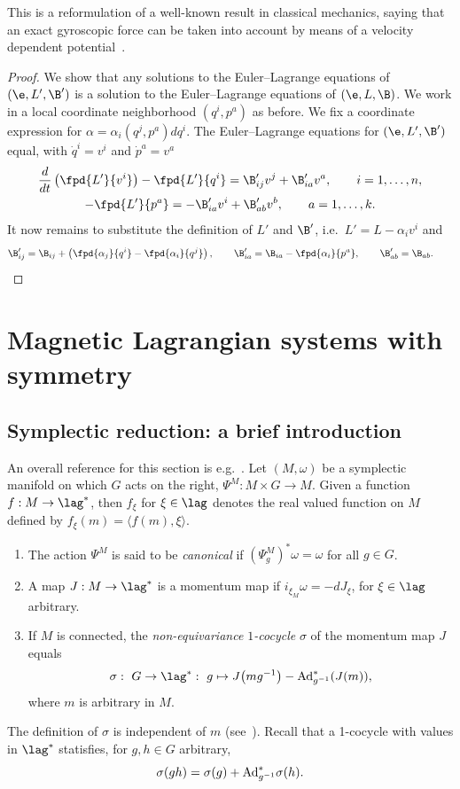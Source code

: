 This is a reformulation of a well-known result in classical mechanics, saying that an exact gyroscopic force can be taken into account by means of a velocity dependent potential~\cite{pars}.
\begin{proof}
We show that any solutions to the Euler--Lagrange equations of $(\e, L',\B ')$ is a solution to the Euler--Lagrange equations of $(\e,L,\B)$. We work in a local coordinate neighborhood $(q^i,p^a)$ as before. We f\/ix a coordinate expression for $\alpha=\alpha_i(q^j,p^a)dq^i$. The Euler--Lagrange equations for $(\e,L',\B')$ equal, with $\dot q^i= v^i$ and $\dot p^a= v^a$
\begin{gather*}
\frac{d}{dt}\left(\fpd{L'}{v^i}\right) -\fpd{L'}{q^i}=\B'_{ij}v^j + \B'_{ia} v^a,\qquad i=1,\ldots,n,\\
  -\fpd{L'}{p^a}=-\B'_{ia}v^i + \B'_{ab} v^b,\qquad a=1,\ldots,k.
\end{gather*}
It now remains to substitute the def\/inition of $L'$ and $\B'$, i.e.\ $L'= L - \alpha_i v^i$ and
\begin{gather*}
\B'_{ij} = \B_{ij} + \left(\fpd{\alpha_j}{q^i}-\fpd{\alpha_i}{q^j}\right), \qquad \B'_{ia} = \B_{ia} - \fpd{\alpha_i}{p^a}, \qquad \B'_{ab} = \B_{ab}. \tag*{\qed}
\end{gather*}
\renewcommand{\qed}{}\end{proof}


\section{Magnetic Lagrangian systems with symmetry}\label{section4}

\subsection{Symplectic reduction: a brief introduction}\label{section4.1}

An overall reference for this section is e.g.~\cite{MarsdenHamRed}. Let $(M,\omega)$ be a symplectic manifold on which $G$ acts on the right, $\Psi^M:M\times G\to M$. Given a function $f: M\to \lag^*$, then $f_\xi$ for $\xi\in\lag$ denotes the real valued function on $M$ def\/ined by $f_\xi(m)= \langle f(m),\xi\rangle$.
\begin{definition}\label{def:cocycle}\mbox{}
\begin{enumerate}\itemsep=0pt
\item The action $\Psi^M$  is said to be {\em canonical} if $(\Psi^M_g)^*\omega=\omega$ for all $g\in G$.
\item A map $J:M\to \lag^*$ is a momentum map if $i_{\xi_M}\omega=-dJ_\xi$, for $\xi \in\lag$ arbitrary.
\item If $M$ is connected, the {\em non-equivariance $1$-cocycle} $\sigma$ of the momentum map $J$ equals
\[
\sigma: \ G\to \lag^*: \ g\mapsto J\big(mg^{-1}\big)-{\rm Ad}^*_{g^{-1}}(J(m)),
\]
where $m$ is arbitrary in $M$.
\end{enumerate}\end{definition}
The def\/inition of $\sigma$ is independent of $m$ (see~\cite{Marsden}). Recall that a 1-cocycle with values in $\lag^*$ statisf\/ies, for $g,h\in G$ arbitrary,
\[
\sigma(gh)=\sigma(g)+ {\rm Ad}^*_{g^{-1}}\sigma(h).
\]


